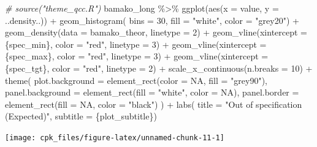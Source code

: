 \documentclass[
]{book}
\newenvironment{Shaded}{\begin{snugshade}}{\end{snugshade}}
\newcommand{\AttributeTok}[1]{\textcolor[rgb]{0.77,0.63,0.00}{#1}}
\newcommand{\CommentTok}[1]{\textcolor[rgb]{0.56,0.35,0.01}{\textit{#1}}}
\newcommand{\ConstantTok}[1]{\textcolor[rgb]{0.00,0.00,0.00}{#1}}
\newcommand{\DecValTok}[1]{\textcolor[rgb]{0.00,0.00,0.81}{#1}}
\newcommand{\FunctionTok}[1]{\textcolor[rgb]{0.00,0.00,0.00}{#1}}
\newcommand{\NormalTok}[1]{#1}
\newcommand{\SpecialCharTok}[1]{\textcolor[rgb]{0.00,0.00,0.00}{#1}}
\newcommand{\StringTok}[1]{\textcolor[rgb]{0.31,0.60,0.02}{#1}}
\begin{document}
\begin{Shaded}
\begin{Highlighting}[]
\CommentTok{\# source("theme\_qcc.R")}
\NormalTok{bamako\_long }\SpecialCharTok{\%\textgreater{}\%}
  \FunctionTok{ggplot}\NormalTok{(}\FunctionTok{aes}\NormalTok{(}\AttributeTok{x =}\NormalTok{ value, }\AttributeTok{y =}\NormalTok{ ..density..)) }\SpecialCharTok{+}
  \FunctionTok{geom\_histogram}\NormalTok{(}
    \AttributeTok{bins =} \DecValTok{30}\NormalTok{,}
    \AttributeTok{fill =} \StringTok{"white"}\NormalTok{,}
    \AttributeTok{color =} \StringTok{"grey20"}\NormalTok{) }\SpecialCharTok{+}
  \FunctionTok{geom\_density}\NormalTok{(}\AttributeTok{data =}\NormalTok{ bamako\_theor, }\AttributeTok{linetype =} \DecValTok{2}\NormalTok{) }\SpecialCharTok{+}
  \FunctionTok{geom\_vline}\NormalTok{(}\AttributeTok{xintercept =}\NormalTok{ \{spec\_min\}, }\AttributeTok{color =} \StringTok{"red"}\NormalTok{, }\AttributeTok{linetype =} \DecValTok{3}\NormalTok{) }\SpecialCharTok{+}
  \FunctionTok{geom\_vline}\NormalTok{(}\AttributeTok{xintercept =}\NormalTok{ \{spec\_max\}, }\AttributeTok{color =} \StringTok{"red"}\NormalTok{, }\AttributeTok{linetype =} \DecValTok{3}\NormalTok{) }\SpecialCharTok{+}
  \FunctionTok{geom\_vline}\NormalTok{(}\AttributeTok{xintercept =}\NormalTok{ \{spec\_tgt\}, }\AttributeTok{color =} \StringTok{"red"}\NormalTok{, }\AttributeTok{linetype =} \DecValTok{2}\NormalTok{) }\SpecialCharTok{+}
  \FunctionTok{scale\_x\_continuous}\NormalTok{(}\AttributeTok{n.breaks =} \DecValTok{10}\NormalTok{) }\SpecialCharTok{+}
  \FunctionTok{theme}\NormalTok{(}
    \AttributeTok{plot.background =} \FunctionTok{element\_rect}\NormalTok{(}\AttributeTok{color =} \ConstantTok{NA}\NormalTok{, }\AttributeTok{fill =} \StringTok{"grey90"}\NormalTok{),}
    \AttributeTok{panel.background =} \FunctionTok{element\_rect}\NormalTok{(}\AttributeTok{fill =} \StringTok{"white"}\NormalTok{, }\AttributeTok{color  =}  \ConstantTok{NA}\NormalTok{),}
    \AttributeTok{panel.border =} \FunctionTok{element\_rect}\NormalTok{(}\AttributeTok{fill =} \ConstantTok{NA}\NormalTok{, }\AttributeTok{color =} \StringTok{"black"}\NormalTok{)}
\NormalTok{  ) }\SpecialCharTok{+}
  \FunctionTok{labs}\NormalTok{(}
    \AttributeTok{title =} \StringTok{"Out of specification (Expected)"}\NormalTok{, }
    \AttributeTok{subtitle =}\NormalTok{ \{plot\_subtitle\})}
\end{Highlighting}
\end{Shaded}

\texttt{[image: cpk\_files/figure-latex/unnamed-chunk-11-1]}
\end{document}
